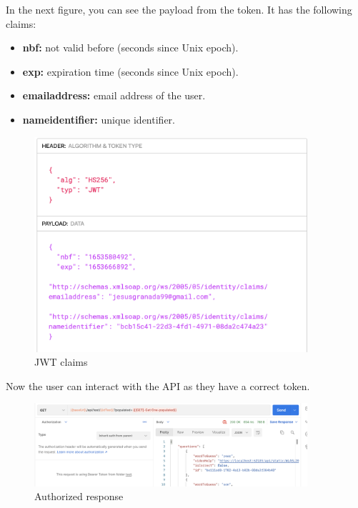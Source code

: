         In the next figure, you can see the payload from the token. It has the following claims:
        \begin{itemize}[noitemsep]
            \item \textbf{nbf:} not valid before (seconds since Unix epoch).
            \item \textbf{exp:} expiration time (seconds since Unix epoch).
            \item \textbf{emailaddress:} email address of the user.
            \item \textbf{nameidentifier:} unique identifier.
        \end{itemize}
        \begin{figure}[H]
            \centering
                \includegraphics[width=0.9\textwidth]{assets/jwt.io.png}
            \caption{JWT claims}
            \label{fig:user_jwtclaims}
        \end{figure}

        Now the user can interact with the API as they have a correct token.
        \begin{figure}[H]
            \centering
                \includegraphics[width=0.9\textwidth]{assets/authorized.png}
            \caption{Authorized response}
            \label{fig:user_authorized}
        \end{figure}


